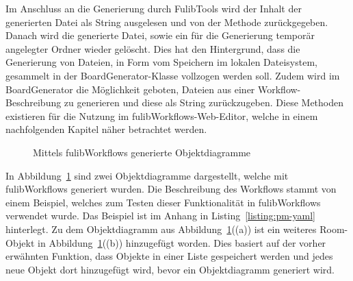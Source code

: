 Im Anschluss an die Generierung durch FulibTools wird der Inhalt der generierten Datei als String ausgelesen und von der Methode zurückgegeben.
Danach wird die generierte Datei, sowie ein für die Generierung temporär angelegter Ordner wieder gelöscht.
Dies hat den Hintergrund, dass die Generierung von Dateien, in Form vom Speichern im lokalen Dateisystem, gesammelt in der BoardGenerator-Klasse vollzogen werden soll.
Zudem wird im BoardGenerator die Möglichkeit geboten, Dateien aus einer Workflow-Beschreibung zu generieren und diese als String zurückzugeben.
Diese Methoden existieren für die Nutzung im fulibWorkflows-Web-Editor, welche in einem nachfolgenden Kapitel näher betrachtet werden.

\begin{figure}%
    \centering
    \qquad
    \caption{Mittels fulibWorkflows generierte Objektdiagramme}%
    \label{fig:generated-object}%
\end{figure}

In Abbildung~\ref{fig:generated-object} sind zwei Objektdiagramme dargestellt, welche mit fulibWorkflows generiert wurden.
Die Beschreibung des Workflows stammt von einem Beispiel, welches zum Testen dieser Funktionalität in fulibWorkflows verwendet wurde.
Das Beispiel ist im Anhang in Listing~\ref{listing:pm-yaml} hinterlegt.
Zu dem Objektdiagramm aus Abbildung~\ref{fig:generated-object}((a)) ist ein weiteres Room-Objekt in Abbildung~\ref{fig:generated-object}((b)) hinzugefügt worden.
Dies basiert auf der vorher erwähnten Funktion, dass Objekte in einer Liste gespeichert werden und jedes neue Objekt dort hinzugefügt wird, bevor ein Objektdiagramm generiert wird.

